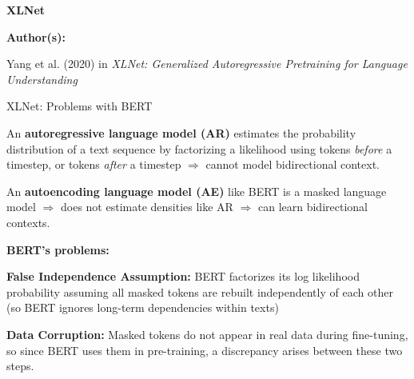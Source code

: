 


\begin{frame}{}
    \begin{center}
        \large \textbf{XLNet}
    \end{center}
    \vspace{20pt}
    
    \textbf{Author(s):}
    \begin{itemizeSpaced}{5pt}
    {\color{DimGrey} 
    
        \item Yang et al. (2020) in \emph{XLNet: Generalized Autoregressive Pretraining for Language Understanding}
        
    }
    \end{itemizeSpaced}
\end{frame}




\begin{frame}{XLNet: Problems with BERT}

\begin{itemizeSpaced}{10pt}
    \pinkbox An \textbf{autoregressive language model (AR)} estimates the probability distribution of a text sequence by factorizing a likelihood using tokens \emph{before} a timestep, or tokens \emph{after} a timestep $\Rightarrow$ cannot model bidirectional context. 
    
    \item An \textbf{autoencoding language model (AE)} like BERT is a masked language model $\Rightarrow$ does not estimate densities like AR $\Rightarrow$ can learn bidirectional contexts. 
    
    \pinkbox \textbf{BERT's problems: }
    \begin{itemizeSpaced}{10pt}
        
        \item \textbf{False Independence Assumption: } BERT factorizes its log likelihood probability \alert{assuming all masked tokens are rebuilt independently of each other (so BERT ignores long-term dependencies within texts)}
        
        \item \textbf{Data Corruption: }Masked tokens do not appear in real data during fine-tuning, so since BERT uses them in pre-training, a \alert{discrepancy} arises between these two steps. 
    \end{itemizeSpaced}
    
    
\end{itemizeSpaced}


    
\end{frame}


